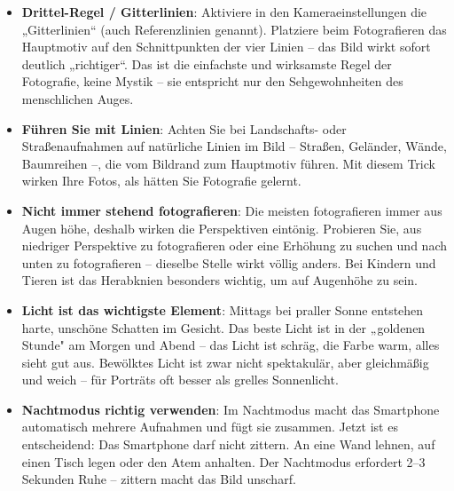 \begin{itemize}
  \item \textbf{Drittel-Regel / Gitterlinien}: Aktiviere in den Kameraeinstellungen die „Gitterlinien“ (auch Referenzlinien genannt). Platziere beim Fotografieren das Hauptmotiv auf den Schnittpunkten der vier Linien – das Bild wirkt sofort deutlich „richtiger“. Das ist die einfachste und wirksamste Regel der Fotografie, keine Mystik – sie entspricht nur den Sehgewohnheiten des menschlichen Auges.
  \item \textbf{Führen Sie mit Linien}: Achten Sie bei Landschafts- oder Straßenaufnahmen auf natürliche Linien im Bild – Straßen, Geländer, Wände, Baumreihen –, die vom Bildrand zum Hauptmotiv führen. Mit diesem Trick wirken Ihre Fotos, als hätten Sie Fotografie gelernt.
  \item \textbf{Nicht immer stehend fotografieren}: Die meisten fotografieren immer aus Augen höhe, deshalb wirken die Perspektiven eintönig. Probieren Sie, aus niedriger Perspektive zu fotografieren oder eine Erhöhung zu suchen und nach unten zu fotografieren – dieselbe Stelle wirkt völlig anders. Bei Kindern und Tieren ist das Herabknien besonders wichtig, um auf Augenhöhe zu sein.
  \item \textbf{Licht ist das wichtigste Element}: Mittags bei praller Sonne entstehen harte, unschöne Schatten im Gesicht. Das beste Licht ist in der „goldenen Stunde" am Morgen und Abend – das Licht ist schräg, die Farbe warm, alles sieht gut aus. Bewölktes Licht ist zwar nicht spektakulär, aber gleichmäßig und weich – für Porträts oft besser als grelles Sonnenlicht.
  \item \textbf{Nachtmodus richtig verwenden}: Im Nachtmodus macht das Smartphone automatisch mehrere Aufnahmen und fügt sie zusammen. Jetzt ist es entscheidend: Das Smartphone darf nicht zittern. An eine Wand lehnen, auf einen Tisch legen oder den Atem anhalten. Der Nachtmodus erfordert 2–3 Sekunden Ruhe – zittern macht das Bild unscharf.
\end{itemize}


